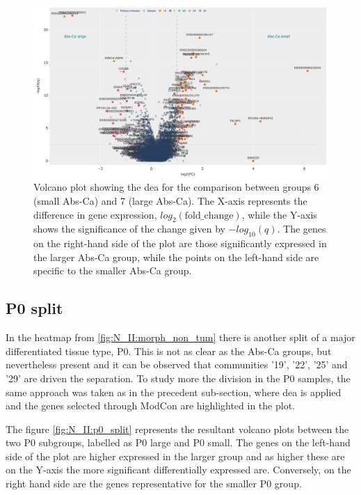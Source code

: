 \begin{figure}   
    \centering
    \includegraphics[width=1.0\textwidth,height=1.0\textheight,keepaspectratio]{Sections/Network_II/resources/non_tum/diff_split_dea.png}
    \caption{Volcano plot showing the \acrfull{dea} for the comparison between groups 6 (small Abs-Ca) and 7 (large Abs-Ca). The X-axis represents the difference in gene expression, $log_2(\text{fold\_change})$, while the Y-axis shows the significance of the change given by $-log_{10}(q)$. The genes on the right-hand side of the plot are those significantly expressed in the larger Abs-Ca group, while the points on the left-hand side are specific to the smaller Abs-Ca group.}
    \label{fig:N_II:diff_split}
\end{figure}


\subsection{P0 split} \label{s:N_II:p0_split}

In the heatmap from \cref{fig:N_II:morph_non_tum} there is another split of a major differentiated tissue type, P0. This is not as clear as the Abs-Ca groups, but nevertheless present and it can be observed that communities '19', '22', '25' and '29' are driven the separation. To study more the division in the P0 samples, the same approach was taken as in the precedent sub-section, where \acrshort{dea} is applied and the genes selected through ModCon are highlighted in the plot.

The figure \cref{fig:N_II:p0_split} represents the resultant volcano plots between the two P0 subgroups, labelled as P0 large and P0 small. The genes on the left-hand side of the plot are higher expressed in the larger group and as higher these are on the Y-axis the more significant differentially expressed are. Conversely, on the right hand side are the genes representative for the smaller P0 group.

